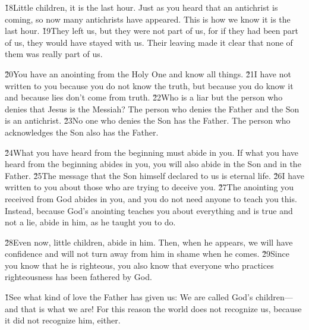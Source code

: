 \v{18}Little children, it is the last hour. Just as you heard that an antichrist is coming, so now many antichrists have appeared. This is how we know it is the last hour. \v{19}They left us, but they were not part of us, for if they had been part of us, they would have stayed with us. Their leaving made it clear that none of them was really part of us.

\v{20}You have an anointing from the Holy One and know all things. \v{21}I have not written to you because you do not know the truth, but because you do know it and because lies don't come from truth. \v{22}Who is a liar but the person who denies that Jesus is the Messiah? The person who denies the Father and the Son is an antichrist. \v{23}No one who denies the Son has the Father. The person who acknowledges the Son also has the Father.

\v{24}What you have heard from the beginning must abide in you. If what you have heard from the beginning abides in you, you will also abide in the Son and in the Father. \v{25}The message that the Son himself declared to us is eternal life. \v{26}I have written to you about those who are trying to deceive you. \v{27}The anointing you received from God abides in you, and you do not need anyone to teach you this. Instead, because God's anointing teaches you about everything and is true and not a lie, abide in him, as he taught you to do.

\v{28}Even now, little children, abide in him. Then, when he appears, we will have confidence and will not turn away from him in shame when he comes. \v{29}Since you know that he is righteous, you also know that everyone who practices righteousness has been fathered by God.

\v{1}See what kind of love the Father has given us: We are called God's children---and that is what we are! For this reason the world does not recognize us, because it did not recognize him, either.

